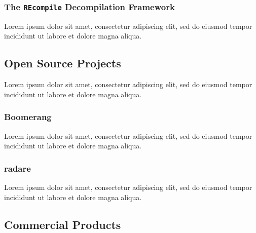 \documentclass[12pt, a4paper]{article}
\begin{document}

\subsubsection{The \texttt{REcompile} Decompilation Framework}

Lorem ipsum dolor sit amet, consectetur adipiscing elit, sed do eiusmod tempor incididunt ut labore et dolore magna aliqua.

\cite{recompile}


\subsection{Open Source Projects}

Lorem ipsum dolor sit amet, consectetur adipiscing elit, sed do eiusmod tempor incididunt ut labore et dolore magna aliqua.


\subsubsection{Boomerang}

Lorem ipsum dolor sit amet, consectetur adipiscing elit, sed do eiusmod tempor incididunt ut labore et dolore magna aliqua.

\cite{boomerang}


\subsubsection{radare}

Lorem ipsum dolor sit amet, consectetur adipiscing elit, sed do eiusmod tempor incididunt ut labore et dolore magna aliqua.

\cite{radare}


\subsection{Commercial Products}
\end{document}
